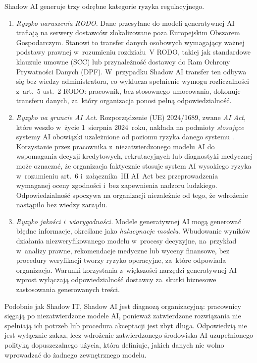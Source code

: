 Shadow AI generuje trzy odrębne kategorie ryzyka regulacyjnego.

\begin{enumerate}[label=(\roman*)]
      \item \textit{Ryzyko naruszenia RODO.}
Dane przesyłane do modeli generatywnej AI trafiają na serwery dostawców zlokalizowane poza Europejskim Obszarem Gospodarczym. Stanowi to transfer danych osobowych wymagający ważnej podstawy prawnej w~rozumieniu rozdziału~V RODO, takiej jak standardowe klauzule umowne (SCC) lub przynależność dostawcy do Ram Ochrony Prywatności Danych (DPF). W~przypadku Shadow AI transfer ten odbywa się bez wiedzy administratora, co wyklucza spełnienie wymogu rozliczalności z~art.~5 ust.~2 RODO: pracownik, bez stosownego umocowania, dokonuje transferu danych, za~który organizacja ponosi pełną odpowiedzialność.

\item \textit{Ryzyko na gruncie AI Act.}
Rozporządzenie (UE) 2024/1689, zwane \textit{AI Act}, które weszło w~życie 1~sierpnia 2024~roku, nakłada na podmioty \textit{stosujące} systemy AI obowiązki uzależnione od poziomu ryzyka danego systemu \autocite{euaiact2024}.
Korzystanie przez pracownika z~niezatwierdzonego modelu AI do wspomagania decyzji kredytowych, rekrutacyjnych lub diagnostyki medycznej może oznaczać, że organizacja faktycznie stosuje system AI wysokiego ryzyka w~rozumieniu art.~6 i~załącznika~III AI~Act bez przeprowadzenia wymaganej oceny zgodności i~bez zapewnienia nadzoru ludzkiego. Odpowiedzialność spoczywa na organizacji niezależnie od tego, że wdrożenie nastąpiło bez wiedzy zarządu.

\item \textit{Ryzyko jakości i~wiarygodności.}
Modele generatywnej AI mogą generować błędne informacje, określane jako \textit{halucynacje modelu}. Wbudowanie wyników działania niezweryfikowanego modelu w~procesy decyzyjne, na~przykład w~analizy prawne, rekomendacje medyczne lub wyceny finansowe, bez procedury weryfikacji tworzy ryzyko operacyjne, za~które odpowiada organizacja. Warunki korzystania z~większości narzędzi generatywnej AI wprost wyłączają odpowiedzialność dostawcy za~skutki biznesowe zastosowania generowanych treści.
\end{enumerate}

Podobnie jak Shadow IT, Shadow AI jest diagnozą organizacyjną: pracownicy sięgają po niezatwierdzone modele AI, ponieważ zatwierdzone rozwiązania nie spełniają ich potrzeb lub procedura akceptacji jest zbyt długa. Odpowiedzią nie jest wyłącznie zakaz, lecz wdrożenie zatwierdzonego środowiska AI uzupełnionego polityką dopuszczalnego użycia, która definiuje, jakich danych nie wolno wprowadzać do żadnego zewnętrznego modelu.


